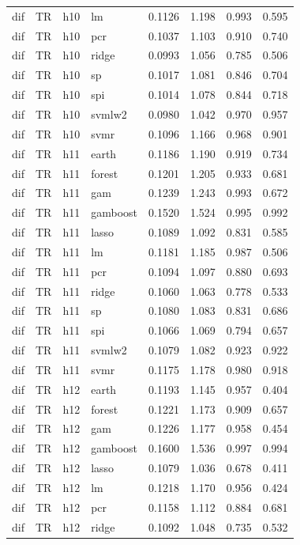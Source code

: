 \begin{ThreePartTable}
\begin{longtable}[t]{llclcccc}
dif & TR & h10 & lm & 0.1126 & 1.198 & 0.993 & 0.595\\
dif & TR & h10 & pcr & 0.1037 & 1.103 & 0.910 & 0.740\\
dif & TR & h10 & ridge & 0.0993 & 1.056 & 0.785 & 0.506\\
dif & TR & h10 & sp & 0.1017 & 1.081 & 0.846 & 0.704\\
dif & TR & h10 & spi & 0.1014 & 1.078 & 0.844 & 0.718\\
dif & TR & h10 & svmlw2 & 0.0980 & 1.042 & 0.970 & 0.957\\
dif & TR & h10 & svmr & 0.1096 & 1.166 & 0.968 & 0.901\\
\addlinespace
dif & TR & h11 & earth & 0.1186 & 1.190 & 0.919 & 0.734\\
dif & TR & h11 & forest & 0.1201 & 1.205 & 0.933 & 0.681\\
dif & TR & h11 & gam & 0.1239 & 1.243 & 0.993 & 0.672\\
dif & TR & h11 & gamboost & 0.1520 & 1.524 & 0.995 & 0.992\\
dif & TR & h11 & lasso & 0.1089 & 1.092 & 0.831 & 0.585\\
dif & TR & h11 & lm & 0.1181 & 1.185 & 0.987 & 0.506\\
dif & TR & h11 & pcr & 0.1094 & 1.097 & 0.880 & 0.693\\
dif & TR & h11 & ridge & 0.1060 & 1.063 & 0.778 & 0.533\\
dif & TR & h11 & sp & 0.1080 & 1.083 & 0.831 & 0.686\\
dif & TR & h11 & spi & 0.1066 & 1.069 & 0.794 & 0.657\\
dif & TR & h11 & svmlw2 & 0.1079 & 1.082 & 0.923 & 0.922\\
dif & TR & h11 & svmr & 0.1175 & 1.178 & 0.980 & 0.918\\
\addlinespace
dif & TR & h12 & earth & 0.1193 & 1.145 & 0.957 & 0.404\\
dif & TR & h12 & forest & 0.1221 & 1.173 & 0.909 & 0.657\\
dif & TR & h12 & gam & 0.1226 & 1.177 & 0.958 & 0.454\\
dif & TR & h12 & gamboost & 0.1600 & 1.536 & 0.997 & 0.994\\
dif & TR & h12 & lasso & 0.1079 & 1.036 & 0.678 & 0.411\\
dif & TR & h12 & lm & 0.1218 & 1.170 & 0.956 & 0.424\\
dif & TR & h12 & pcr & 0.1158 & 1.112 & 0.884 & 0.681\\
dif & TR & h12 & ridge & 0.1092 & 1.048 & 0.735 & 0.532\\

\end{longtable}
\end{ThreePartTable}
